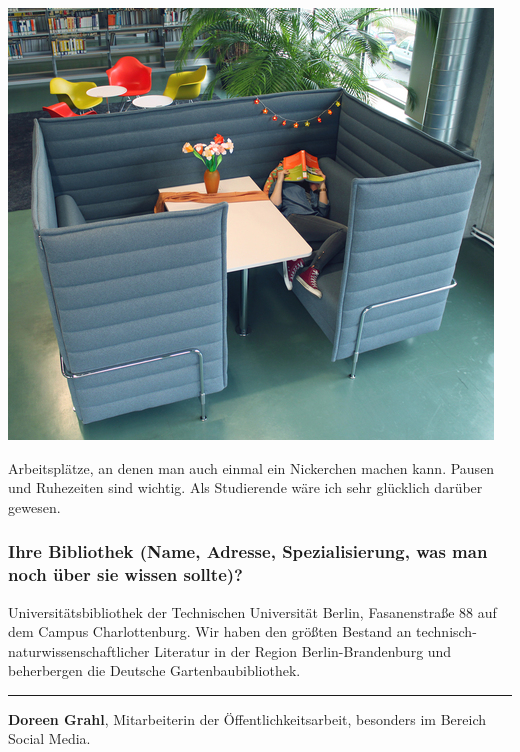 \begin{center}
\includegraphics{tu-berlin/img/workbays.jpg}
\end{center}

Arbeitsplätze, an denen man auch einmal ein Nickerchen machen kann.
Pausen und Ruhezeiten sind wichtig. Als Studierende wäre ich sehr
glücklich darüber gewesen.

\hypertarget{ihre-bibliothek-name-adresse-spezialisierung-was-man-noch-uxfcber-sie-wissen-sollte}{%
\subsubsection*{Ihre Bibliothek (Name, Adresse, Spezialisierung, was man noch
über sie wissen
sollte)?}\label{ihre-bibliothek-name-adresse-spezialisierung-was-man-noch-uxfcber-sie-wissen-sollte}}

Universitätsbibliothek der Technischen Universität Berlin, Fasanenstraße
88 auf dem Campus Charlottenburg. Wir haben den größten Bestand an
technisch-naturwissenschaftlicher Literatur in der Region
Berlin-Brandenburg und beherbergen die Deutsche Gartenbaubibliothek.

\begin{center}\rule{0.5\linewidth}{\linethickness}\end{center}

\textbf{Doreen Grahl}, Mitarbeiterin der Öffentlichkeitsarbeit,
besonders im Bereich Social Media.

